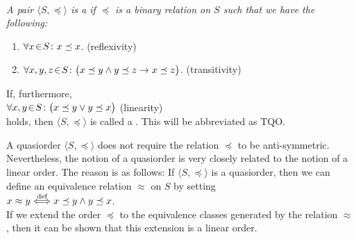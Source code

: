 \begin{Definition}[Quasiorder]  \hspace*{\fill} \\
{\em
  A pair $\langle S, \preceq\rangle$ is a   if $\preceq$ is a 
  binary relation on $S$ such that we have the following:
  \begin{enumerate}
  \item $\forall x \!\in\! S\colon x \preceq x$. \hspace*{\fill} (reflexivity)
  \item $\forall x, y, z \!\in\! S \colon \bigl(x \preceq y \wedge y \preceq z \rightarrow x \preceq z\bigr)$. 
         \hspace*{\fill} (transitivity)
  \end{enumerate}
  If, furthermore,
  \\[0.2cm]
  \hspace*{1.3cm}
  $\forall x, y \!\in\! S \colon \bigl(x \preceq y \vee y \preceq x\bigr)$ \hspace*{\fill} (linearity)
  \\[0.2cm]
  holds, then $\langle S, \preceq \rangle$ is called a .  This will be
  abbreviated as \textsc{TQO}.
}
\end{Definition}
A quasiorder $\langle S, \preceq \rangle$ does not require the relation $\preceq$ to be
anti-symmetric.  Nevertheless, the notion of a quasiorder is very closely related to the notion of a
linear order.  The reason is as follows:  If $\langle S, \preceq \rangle$ is a quasiorder, then we
can define an equivalence relation $\approx$ on $S$ by setting
\\[0.2cm]
\hspace*{1.3cm}
$x \approx y \stackrel{\mbox{\scriptsize def}}{\Longleftrightarrow} x \preceq y \wedge y \preceq x$. 
\\[0.2cm]
If we extend the order $\preceq$ to the equivalence classes generated by the relation $\approx$,
then it can be shown that this extension is a linear order.
\vspace*{0.3cm}

